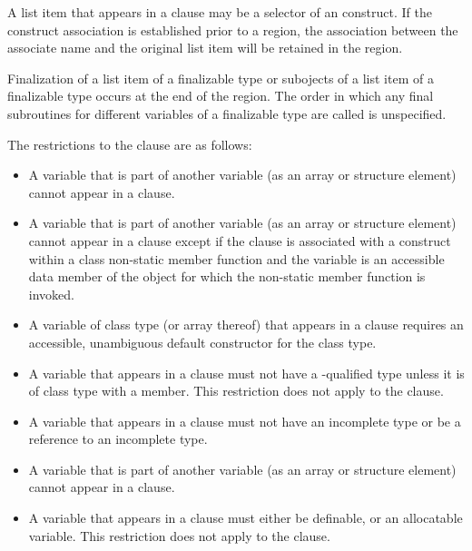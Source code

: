 {{{{A list item that appears in a  clause may be a selector of an  
construct. If the construct association is established prior to a  region, the 
association between the associate name and the original list item will be retained in the 
region.

Finalization of a list item of a finalizable type or subojects of a
list item of a finalizable type occurs at the end of the region. The
order in which any final subroutines for different variables of a
finalizable type are called is unspecified.
\fortranspecificend

\restrictions
The restrictions to the  clause are as follows:

\begin{itemize}
\cspecificstart
\item A variable that is part of another variable (as an array or structure element) cannot 
appear in a  clause.
\cspecificend

\cppspecificstart
\item A variable that is part of another variable (as an array or structure element) cannot 
appear in a  clause except if the  clause is associated with a construct within a class non-static member function and the variable is an accessible data member of the object for which the non-static member function is invoked.

\item A variable of class type (or array thereof) that appears in a  clause requires 
an accessible, unambiguous default constructor for the class type. 
\cppspecificend

\ccppspecificstart
\item A variable that appears in a  clause must not have a -qualified type 
unless it is of class type with a  member. This restriction does not apply to 
the  clause.

\item A variable that appears in a  clause must not have an incomplete type or be a reference to an incomplete type.
\ccppspecificend


\fortranspecificstart
\item A variable that is part of another variable (as an array or structure element) cannot 
appear in a  clause.

\item A variable that appears in a  clause must either be definable, or an 
allocatable variable. This restriction does not apply to the  clause.


\end{itemize}}}}}
